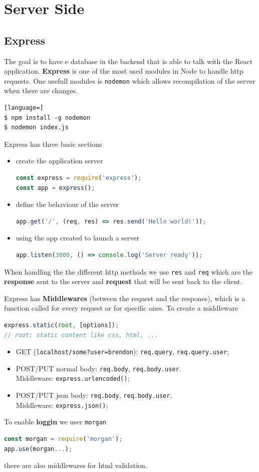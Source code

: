 \documentclass[12pt]{article}
\begin{document}
\newpage
\section{Server Side}
\subsection{Express}
The goal is to have e database in the backend that is able to talk with the React application. \textbf{Express} is one of the most used modules in Node to handle http requests. One usefull modules is \texttt{nodemon} which allows recompilation of the server when there are changes.
\begin{lstlisting}[language=]
$ npm install -g nodemon
$ nodemon index.js
\end{lstlisting}
Express has three basic sections
\begin{itemize}
  \item create the application server
  \begin{lstlisting}[language=js]
const express = require('express');
const app = express();
  \end{lstlisting}
  \item define the behaviour of the server
  \begin{lstlisting}[language=js]
app.get('/', (req, res) => res.send('Hello world!')); 
  \end{lstlisting}
  \item using the app created to launch a server
  \begin{lstlisting}[language=js]
app.listen(3000, () => console.log('Server ready')); 
  \end{lstlisting}
\end{itemize}
When handling the the different http methods we use \texttt{res} and \texttt{req} which are the \textbf{response} sent to the server and \textbf{request} that will be sent back to the client.

Express has \textbf{Middlewares} (between the request and the respones), which is a function called for every request or for specific ones. To create a middleware
\begin{lstlisting}[language=js]
express.static(root, [options]);
// root: static content like css, html, ...
\end{lstlisting}
\begin{itemize}
  \item GET (\texttt{localhost/some?user=brendon}): \texttt{req.query}, \texttt{req.query.user};
  \item POST/PUT normal body: \texttt{req.body}, \texttt{req.body.user}. \\ Middleware: \texttt{express.urlencoded()};
  \item POST/PUT json body: \texttt{req.body}, \texttt{req.body.user}. \\ Middleware: \texttt{express.json()};
\end{itemize}
To enable \textbf{loggin} we user \texttt{morgan}
\begin{lstlisting}[language=js]
const morgan = require('morgan');
app.use(morgan...);
\end{lstlisting}
there are also middlewares for html validation.
\end{document}
